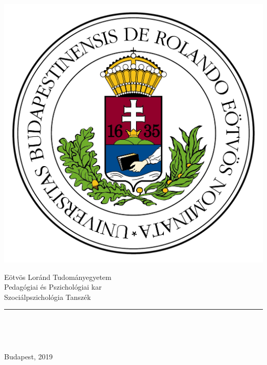 \begin{titlepage}

\begin{minipage}{0.40\linewidth}
\includegraphics[scale=0.3]{images/elte_logo}
\end{minipage}
\begin{minipage}{0.50\linewidth}
\begin{center}
Eötvös Loránd Tudományegyetem \\
Pedagógiai és Pszichológiai kar \\
Szociálpszichológia Tanszék
\end{center}
\end{minipage}

\hrule
 \vfill

\begin{center}
\Huge
\textbf{\Title}
\normalsize
\end{center}

\begin{center}
	\Large
	\textbf{\SubTitle}
	\normalsize
\end{center}

\vfill

\begin{minipage}[t]{0.45\linewidth}
\begin{flushleft}
\textbf{\SupervisorName} \\
\SupervisorTitle
\end{flushleft}
\end{minipage}
\begin{minipage}[t]{0.5\linewidth}
\begin{flushright}
\textbf{\Author} \\
\AuthortTitle
\end{flushright}
\end{minipage}

\vfill

\begin{center}
Budapest, 2019
\end{center}

\end{titlepage}
